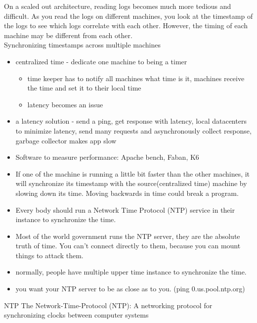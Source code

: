 \documentclass[fancy,11pt,titlestyle=display]{style/elegantbook}
\begin{document}
On a scaled out architecture, reading logs becomes much more tedious and difficult.
As you read the logs on different machines, you look at the timestamp of the logs to see which logs correlate with each other.
However, the timing of each machine may be different from each other.\\

\noindent Synchronizing timestamps across multiple machines
\begin{itemize}
    \item centralized time - dedicate one machine to being a timer
    \begin{itemize}
        \item time keeper has to notify all machines what time is it, machines receive the time and set it to their local time 
        \item latency becomes an issue
    \end{itemize}
    \item a latency solution - send a ping, get response with latency, local datacenters to minimize latency, send many requests and asynchronously collect response, 
    garbage collector makes app slow
    \item Software to measure performance: Apache bench, Faban, K6
    \item If one of the machine is running a little bit faster than the other machines, it will synchronize its timestamp with the source(centralized time) machine by slowing down its time. Moving backwards in time could break a program.
    \item Every body should run a Network Time Protocol (NTP) service in their instance to synchronize the time.
    \item Most of the world government runs the NTP server, they are the absolute truth of time. You can't connect directly to them, because you can mount things to attack them.
    \item normally, people have multiple upper time instance to synchronize the time.
    \item you want your NTP server to be as close as to you. (ping 0.us.pool.ntp.org)

\end{itemize}

\begin{definition}{NTP}{}
The Network-Time-Protocol (NTP): A networking protocol for synchronizing clocks between computer systems
\end{definition}
\end{document}
